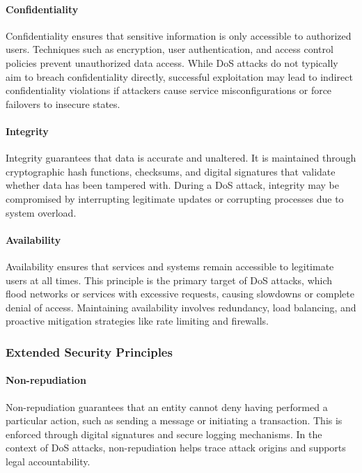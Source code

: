 \documentclass{report}
\begin{document}
\paragraph{Confidentiality} 
Confidentiality ensures that sensitive information is only accessible to authorized users. Techniques such as encryption, user authentication, and access control policies prevent unauthorized data access. While DoS attacks do not typically aim to breach confidentiality directly, successful exploitation may lead to indirect confidentiality violations if attackers cause service misconfigurations or force failovers to insecure states.

\paragraph{Integrity} 
Integrity guarantees that data is accurate and unaltered. It is maintained through cryptographic hash functions, checksums, and digital signatures that validate whether data has been tampered with. During a DoS attack, integrity may be compromised by interrupting legitimate updates or corrupting processes due to system overload.

\paragraph{Availability} 
Availability ensures that services and systems remain accessible to legitimate users at all times. This principle is the primary target of DoS attacks, which flood networks or services with excessive requests, causing slowdowns or complete denial of access. Maintaining availability involves redundancy, load balancing, and proactive mitigation strategies like rate limiting and firewalls.

\subsubsection{Extended Security Principles}

\paragraph{Non-repudiation} 
Non-repudiation guarantees that an entity cannot deny having performed a particular action, such as sending a message or initiating a transaction. This is enforced through digital signatures and secure logging mechanisms. In the context of DoS attacks, non-repudiation helps trace attack origins and supports legal accountability.
\end{document}
